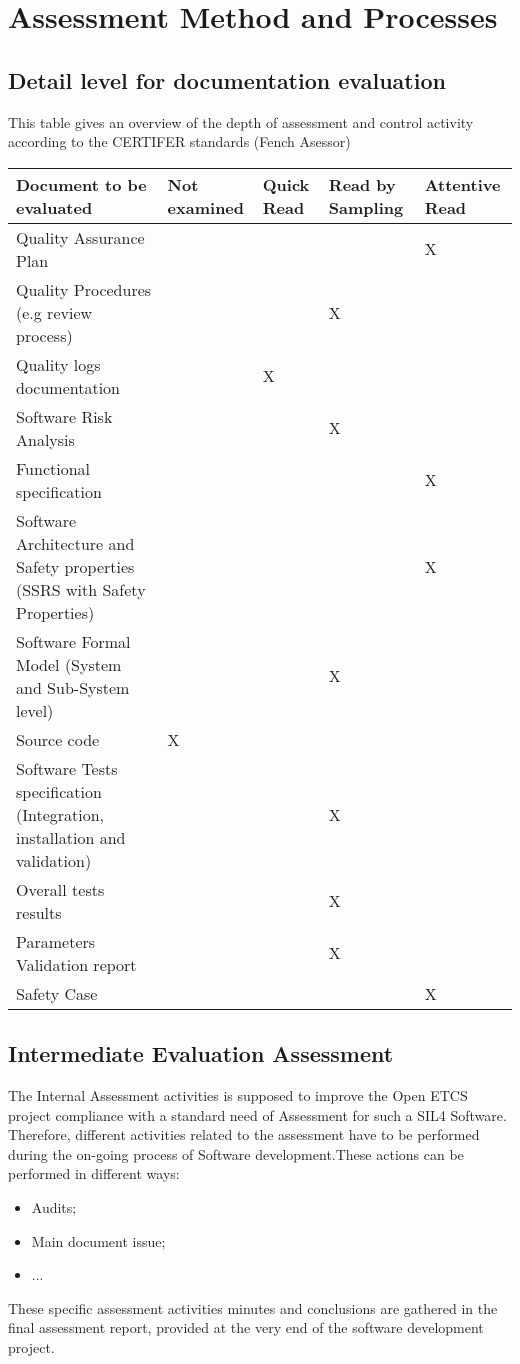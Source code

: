 \documentclass{template/openetcs_article}
\begin{document}
\section{Assessment Method and Processes}

\subsection{Detail level for documentation evaluation}

This table gives an overview of the depth of assessment and control activity according to the CERTIFER standards (Fench Asessor)

\begin{tabular}{|p{5cm}|p{2cm}|p{2cm}|p{2cm}|p{2cm}|} 
\hline
\textbf{Document to be evaluated} & \textbf{Not examined} & \textbf{Quick Read} & \textbf{Read by Sampling} & \textbf{Attentive Read} \\ \hline
Quality Assurance Plan & & & & X \\ \hline
Quality Procedures (e.g review process) & & & X & \\ \hline
Quality logs documentation & & X & & \\ \hline
Software Risk Analysis & & & X & \\ \hline
Functional specification & & & & X \\ \hline
Software Architecture and Safety properties (SSRS with Safety Properties) & & & & X \\ \hline
Software Formal Model (System and Sub-System level) & & & X & \\ \hline
Source code & X & & & \\ \hline
Software Tests specification (Integration, installation and validation) & & & X & \\ \hline
Overall tests results & & & X & \\ \hline
Parameters Validation report & & & X & \\ \hline
Safety Case & & & & X \\ \hline
\end{tabular}

\subsection{Intermediate Evaluation Assessment}
The Internal Assessment activities is supposed to improve the Open ETCS project compliance with a standard need of Assessment for such a SIL4 Software. Therefore, different activities related to the assessment have to be performed during the on-going process of Software development.These actions can be performed in different ways:
\begin{itemize}
\item Audits;
\item Main document issue;
\item ...
\end{itemize}
These specific assessment activities minutes and conclusions are gathered in the final assessment report, provided at the very end of the software development project.
\end{document}
